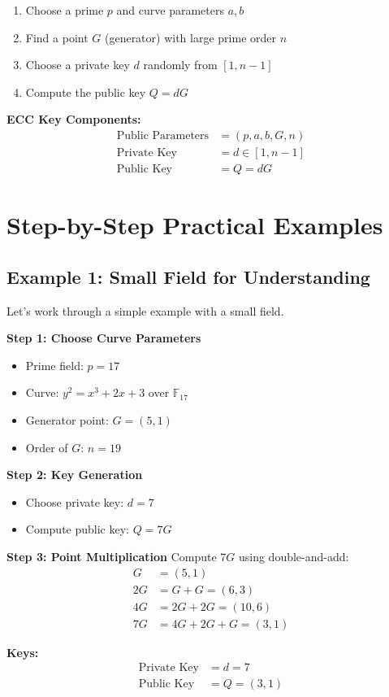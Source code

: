 \documentclass[11pt,a4paper]{article}
\begin{document}
\begin{enumerate}
    \item Choose a prime $p$ and curve parameters $a, b$
    \item Find a point $G$ (generator) with large prime order $n$
    \item Choose a private key $d$ randomly from $[1, n-1]$
    \item Compute the public key $Q = dG$
\end{enumerate}

\begin{mathbox}
\textbf{ECC Key Components:}
\begin{align*}
\text{Public Parameters} &= (p, a, b, G, n) \\
\text{Private Key} &= d \in [1, n-1] \\
\text{Public Key} &= Q = dG
\end{align*}
\end{mathbox}

\section{Step-by-Step Practical Examples}

\subsection{Example 1: Small Field for Understanding}

Let's work through a simple example with a small field.

\begin{examplebox}
\textbf{Step 1: Choose Curve Parameters}
\begin{itemize}
    \item Prime field: $p = 17$
    \item Curve: $y^2 = x^3 + 2x + 3$ over $\mathbb{F}_{17}$
    \item Generator point: $G = (5, 1)$
    \item Order of $G$: $n = 19$
\end{itemize}

\textbf{Step 2: Key Generation}
\begin{itemize}
    \item Choose private key: $d = 7$
    \item Compute public key: $Q = 7G$
\end{itemize}

\textbf{Step 3: Point Multiplication}
Compute $7G$ using double-and-add:
\begin{align*}
G &= (5, 1) \\
2G &= G + G = (6, 3) \\
4G &= 2G + 2G = (10, 6) \\
7G &= 4G + 2G + G = (3, 1)
\end{align*}

\textbf{Keys:}
\begin{align*}
\text{Private Key} &= d = 7 \\
\text{Public Key} &= Q = (3, 1)
\end{align*}
\end{examplebox}
\end{document}

